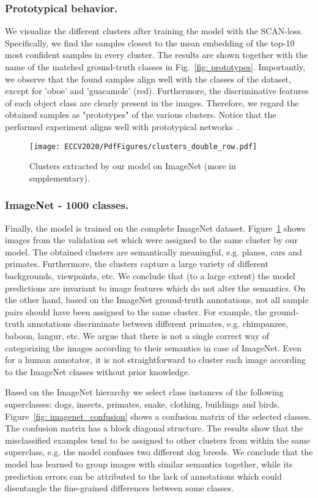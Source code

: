 \documentclass[runningheads]{llncs}
\begin{document}
\subsubsection{Prototypical behavior.}
We visualize the different clusters after training the model with the SCAN-loss. Specifically, we find the samples closest to the mean embedding of the top-10 most confident samples in every cluster. The results are shown together with the name of the matched ground-truth classes in Fig.~\ref{fig: prototypes}. Importantly, we observe that the found samples align well with the classes of the dataset, except for 'oboe' and 'guacamole' (red). Furthermore, the discriminative features of each object class are clearly present in the images. Therefore, we regard the obtained samples as "prototypes" of the various clusters. Notice that the performed experiment aligns well with prototypical networks~\cite{snell2017prototypical}.

\begin{figure}
\centering
\texttt{[image: ECCV2020/PdfFigures/clusters\_double\_row.pdf]}
\caption{Clusters extracted by our model on ImageNet (more in supplementary).}
\label{fig: imagenet_clusters}
\end{figure}

\subsubsection{ImageNet - 1000 classes.}
Finally, the model is trained on the complete ImageNet dataset. Figure~\ref{fig: imagenet_clusters} shows images from the validation set which were assigned to the same cluster by our model. The obtained clusters are semantically meaningful, e.g. planes, cars and primates. Furthermore, the clusters capture a large variety of different backgrounds, viewpoints, etc. We conclude that (to a large extent) the model predictions are invariant to image features which do not alter the semantics. On the other hand, based on the ImageNet ground-truth annotations, not all sample pairs should have been assigned to the same cluster. For example, the ground-truth annotations discriminate between different primates, e.g. chimpanzee, baboon, langur, etc. We argue that there is not a single correct way of categorizing the images according to their semantics in case of ImageNet. Even for a human annotator, it is not straightforward to cluster each image according to the ImageNet classes without prior knowledge. 

Based on the ImageNet hierarchy we select class instances of the following superclasses: dogs, insects, primates, snake, clothing, buildings and birds. Figure~\ref{fig: imagenet_confusion} shows a confusion matrix of the selected classes. The confusion matrix has a block diagonal structure. The results show that the misclassified examples tend to be assigned to other clusters from within the same superclass, e.g. the model confuses two different dog breeds. We conclude that the model has learned to group images with similar semantics together, while its prediction errors can be attributed to the lack of annotations which could disentangle the fine-grained differences between some classes. 
\end{document}
